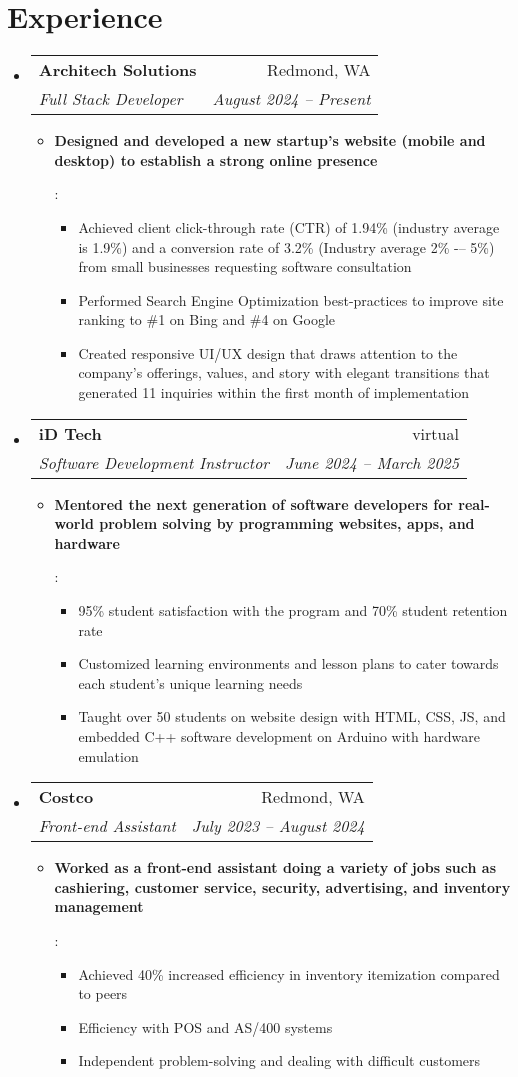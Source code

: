 \documentclass[letterpaper,11pt]{article}
\makeatletter
\newcommand{\resumeItem}[2]{
  \item\small{
    \textbf{#1}{: #2 \vspace{-2pt}}
  }
}
\newcommand{\resumeSubheading}[4]{
  \vspace{-1pt}\item
    \begin{tabular*}{0.97\textwidth}[t]{l@{\extracolsep{\fill}}r}
      \textbf{#1} & #2 \\
      \textit{\small#3} & \textit{\small #4} \\
    \end{tabular*}\vspace{-5pt}
}
\newcommand{\resumeSubHeadingListStart}{\begin{itemize}[leftmargin=*]}
\newcommand{\resumeSubHeadingListEnd}{\end{itemize}}
\newcommand{\resumeItemListStart}{\begin{itemize}}
\newcommand{\resumeItemListEnd}{\end{itemize}\vspace{-5pt}}
\makeatother
\begin{document}
\section{Experience}
    \resumeSubHeadingListStart
        \resumeSubheading
            {Architech Solutions}{Redmond, WA}
            {Full Stack Developer}{August 2024 -- Present}
            \resumeItemListStart
                \resumeItem{Designed and developed a new startup’s website (mobile and desktop) to establish a strong online presence}
                {
                    \begin{itemize}
                    \item Achieved client click-through rate (CTR) of 1.94\% (industry average is 1.9\%) and a conversion rate of 3.2\% (Industry average 2\% -– 5\%) from small businesses requesting software consultation
                    \item Performed Search Engine Optimization best-practices to improve site ranking to \#1 on Bing and \#4 on Google
                    \item Created responsive UI/UX design that draws attention to the company’s offerings, values, and story with elegant transitions that generated 11 inquiries within the first month of implementation
                    \end{itemize}
                }
            \resumeItemListEnd
    \resumeSubheading
        {iD Tech}{virtual}
        {Software Development Instructor}{June 2024 -- March 2025}
        \resumeItemListStart
        \resumeItem{Mentored the next generation of software developers for real-world problem solving by programming websites, apps, and hardware}
        {
            \begin{itemize}
            \item 95\% student satisfaction with the program and 70\% student retention rate 
            \item Customized learning environments and lesson plans to cater towards each student’s unique learning needs
            \item Taught over 50 students on website design with HTML, CSS, JS, and embedded C++ software development on Arduino with hardware emulation 
            \end{itemize}
        }
        \resumeItemListEnd
        \resumeSubheading
            {Costco}{Redmond, WA}
            {Front-end Assistant}{July 2023 -- August 2024}
            \resumeItemListStart
                \resumeItem{Worked as a front-end assistant doing a variety of jobs such as cashiering, customer service, security, advertising, and inventory management}
                {
                    \begin{itemize}
                    \item Achieved 40\% increased efficiency in inventory itemization compared to peers
                    \item Efficiency with POS and AS/400 systems
                    \item Independent problem-solving and dealing with difficult customers
                    \end{itemize}
                }
            \resumeItemListEnd
        \resumeSubHeadingListEnd
\end{document}
